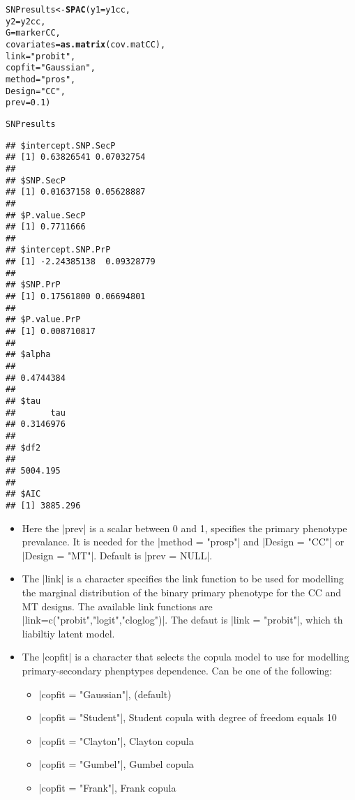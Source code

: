 \documentclass{article}\usepackage[]{graphicx}\usepackage[]{color}
\makeatletter
\newcommand{\hlnum}[1]{\textcolor[rgb]{0.686,0.059,0.569}{#1}}%
\newcommand{\hlstr}[1]{\textcolor[rgb]{0.192,0.494,0.8}{#1}}%
\newcommand{\hlstd}[1]{\textcolor[rgb]{0.345,0.345,0.345}{#1}}%
\newcommand{\hlkwb}[1]{\textcolor[rgb]{0.69,0.353,0.396}{#1}}%
\newcommand{\hlkwc}[1]{\textcolor[rgb]{0.333,0.667,0.333}{#1}}%
\newcommand{\hlkwd}[1]{\textcolor[rgb]{0.737,0.353,0.396}{\textbf{#1}}}%
\newenvironment{kframe}{%
 \def\at@end@of@kframe{}%
 \ifinner\ifhmode%
  \def\at@end@of@kframe{\end{minipage}}%
  \begin{minipage}{\columnwidth}%
 \fi\fi%
 \def\FrameCommand##1{\hskip\@totalleftmargin \hskip-\fboxsep
 \colorbox{shadecolor}{##1}\hskip-\fboxsep
     \hskip-\linewidth \hskip-\@totalleftmargin \hskip\columnwidth}%
 \MakeFramed {\advance\hsize-\width
   \@totalleftmargin\z@ \linewidth\hsize
   \@setminipage}}%
 {\par\unskip\endMakeFramed%
 \at@end@of@kframe}
\newenvironment{knitrout}{}{} %
\makeatother
\begin{document}
\begin{knitrout}
\color{fgcolor}\begin{kframe}
\begin{alltt}
\hlstd{SNPresults} \hlkwb{<-} \hlkwd{SPAC}\hlstd{(}\hlkwc{y1} \hlstd{= y1cc,}
                   \hlkwc{y2} \hlstd{= y2cc,}
                   \hlkwc{G} \hlstd{= markerCC,}
                   \hlkwc{covariates} \hlstd{=} \hlkwd{as.matrix}\hlstd{(cov.matCC),}
                   \hlkwc{link} \hlstd{=} \hlstr{"probit"}\hlstd{,}
                   \hlkwc{copfit} \hlstd{=} \hlstr{"Gaussian"}\hlstd{,}
                   \hlkwc{method} \hlstd{=} \hlstr{"pros"}\hlstd{,}
                   \hlkwc{Design} \hlstd{=} \hlstr{"CC"}\hlstd{,}
                   \hlkwc{prev} \hlstd{=} \hlnum{0.1}\hlstd{)}
\end{alltt}


{\ttfamily\noindent\itshape\color{messagecolor}{\#\# Starting association analysis of the SNP...}}\begin{alltt}
\hlstd{SNPresults}
\end{alltt}
\begin{verbatim}
## $intercept.SNP.SecP
## [1] 0.63826541 0.07032754
## 
## $SNP.SecP
## [1] 0.01637158 0.05628887
## 
## $P.value.SecP
## [1] 0.7711666
## 
## $intercept.SNP.PrP
## [1] -2.24385138  0.09328779
## 
## $SNP.PrP
## [1] 0.17561800 0.06694801
## 
## $P.value.PrP
## [1] 0.008710817
## 
## $alpha
##           
## 0.4744384 
## 
## $tau
##       tau 
## 0.3146976 
## 
## $df2
##          
## 5004.195 
## 
## $AIC
## [1] 3885.296
\end{verbatim}
\end{kframe}
\end{knitrout}

\begin{itemize}
\item Here the |prev| is a scalar between 0 and 1, specifies the primary phenotype prevalance.
It is needed for the |method = "prosp"| and |Design = "CC"| or |Design = "MT"|. Default is |prev = NULL|.


\item The |link| is a character specifies the link function to be used for modelling the marginal distribution of the binary primary phenotype for the CC and MT designs. The available link functions are |link=c("probit","logit","cloglog")|. The defaut is |link = "probit"|, which th liabiltiy latent model.

\item The |copfit| is a character that selects the copula model to use for modelling primary-secondary phenptypes dependence. Can be one of the following:
\begin{itemize}
\item |copfit = "Gaussian"|, (default)
\item |copfit = "Student"|, Student copula with degree of freedom equals 10
\item |copfit = "Clayton"|, Clayton copula
\item |copfit = "Gumbel"|, Gumbel copula
\item |copfit = "Frank"|, Frank copula
\end{itemize}
\end{itemize}
\end{document}
